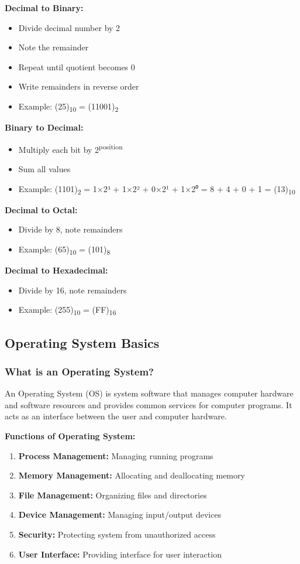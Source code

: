 \documentclass[12pt,a4paper]{article}
\begin{document}
\textbf{Decimal to Binary:}
\begin{itemize}
    \item Divide decimal number by 2
    \item Note the remainder
    \item Repeat until quotient becomes 0
    \item Write remainders in reverse order
    \item Example: (25)\textsubscript{10} = (11001)\textsubscript{2}
\end{itemize}

\textbf{Binary to Decimal:}
\begin{itemize}
    \item Multiply each bit by 2\textsuperscript{position}
    \item Sum all values
    \item Example: (1101)\textsubscript{2} = 1×2³ + 1×2² + 0×2¹ + 1×2⁰ = 8 + 4 + 0 + 1 = (13)\textsubscript{10}
\end{itemize}

\textbf{Decimal to Octal:}
\begin{itemize}
    \item Divide by 8, note remainders
    \item Example: (65)\textsubscript{10} = (101)\textsubscript{8}
\end{itemize}

\textbf{Decimal to Hexadecimal:}
\begin{itemize}
    \item Divide by 16, note remainders
    \item Example: (255)\textsubscript{10} = (FF)\textsubscript{16}
\end{itemize}

\subsection{Operating System Basics}

\subsubsection{What is an Operating System?}
An Operating System (OS) is system software that manages computer hardware and software resources and provides common services for computer programs. It acts as an interface between the user and computer hardware.

\textbf{Functions of Operating System:}
\begin{enumerate}
    \item \textbf{Process Management:} Managing running programs
    \item \textbf{Memory Management:} Allocating and deallocating memory
    \item \textbf{File Management:} Organizing files and directories
    \item \textbf{Device Management:} Managing input/output devices
    \item \textbf{Security:} Protecting system from unauthorized access
    \item \textbf{User Interface:} Providing interface for user interaction
\end{enumerate}
\end{document}
